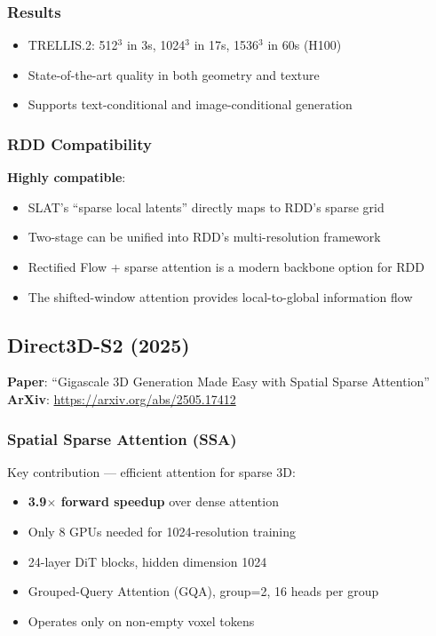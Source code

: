 \documentclass[11pt, a4paper]{article}
\begin{document}
\subsubsection{Results}

\begin{itemize}
    \item TRELLIS.2: 512$^3$ in 3s, 1024$^3$ in 17s, 1536$^3$ in 60s (H100)
    \item State-of-the-art quality in both geometry and texture
    \item Supports text-conditional and image-conditional generation
\end{itemize}

\subsubsection{RDD Compatibility}

\textbf{Highly compatible}:
\begin{itemize}
    \item SLAT's ``sparse local latents'' directly maps to RDD's sparse grid
    \item Two-stage can be unified into RDD's multi-resolution framework
    \item Rectified Flow + sparse attention is a modern backbone option for RDD
    \item The shifted-window attention provides local-to-global information flow
\end{itemize}

\subsection{Direct3D-S2 (2025)}

\textbf{Paper}: ``Gigascale 3D Generation Made Easy with Spatial Sparse Attention''\\
\textbf{ArXiv}: \url{https://arxiv.org/abs/2505.17412}

\subsubsection{Spatial Sparse Attention (SSA)}

Key contribution --- efficient attention for sparse 3D:
\begin{itemize}
    \item \textbf{3.9$\times$ forward speedup} over dense attention
    \item Only 8 GPUs needed for 1024-resolution training
    \item 24-layer DiT blocks, hidden dimension 1024
    \item Grouped-Query Attention (GQA), group=2, 16 heads per group
    \item Operates only on non-empty voxel tokens
\end{itemize}
\end{document}
